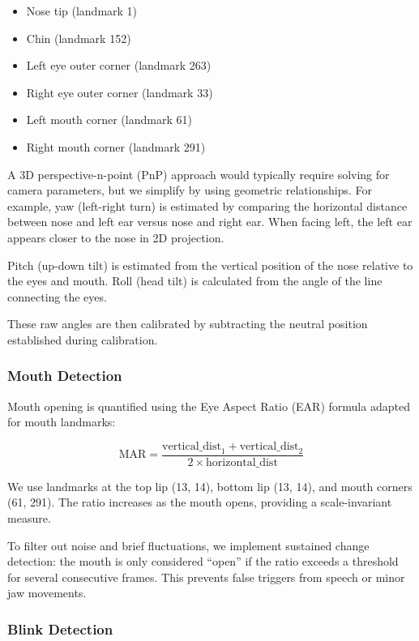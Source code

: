 \documentclass[sigconf]{acmart}
\begin{document}
\begin{itemize}
\item Nose tip (landmark 1)
\item Chin (landmark 152)
\item Left eye outer corner (landmark 263)
\item Right eye outer corner (landmark 33)
\item Left mouth corner (landmark 61)
\item Right mouth corner (landmark 291)
\end{itemize}

A 3D perspective-n-point (PnP) approach would typically require solving for camera parameters, but we simplify by using geometric relationships. For example, yaw (left-right turn) is estimated by comparing the horizontal distance between nose and left ear versus nose and right ear. When facing left, the left ear appears closer to the nose in 2D projection.

Pitch (up-down tilt) is estimated from the vertical position of the nose relative to the eyes and mouth. Roll (head tilt) is calculated from the angle of the line connecting the eyes.

These raw angles are then calibrated by subtracting the neutral position established during calibration.

\subsubsection{Mouth Detection}

Mouth opening is quantified using the Eye Aspect Ratio (EAR) formula adapted for mouth landmarks:

\begin{equation}
\text{MAR} = \frac{\text{vertical\_dist}_1 + \text{vertical\_dist}_2}{2 \times \text{horizontal\_dist}}
\end{equation}

We use landmarks at the top lip (13, 14), bottom lip (13, 14), and mouth corners (61, 291). The ratio increases as the mouth opens, providing a scale-invariant measure.

To filter out noise and brief fluctuations, we implement sustained change detection: the mouth is only considered ``open'' if the ratio exceeds a threshold for several consecutive frames. This prevents false triggers from speech or minor jaw movements.

\subsubsection{Blink Detection}
\end{document}
